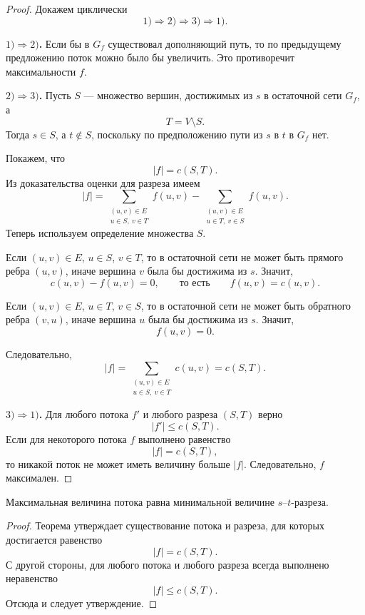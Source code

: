 \begin{proof}
	Докажем циклически
	\[
	1)\Rightarrow 2)\Rightarrow 3)\Rightarrow 1).
	\]
	
	\textbf{$1)\Rightarrow 2)$.}
	Если бы в $G_f$ существовал дополняющий путь, то по предыдущему предложению поток можно было бы увеличить. Это противоречит максимальности $f$.
	
	\textbf{$2)\Rightarrow 3)$.}
	Пусть $S$ --- множество вершин, достижимых из $s$ в остаточной сети $G_f$, а
	\[
	T=V\setminus S.
	\]
	Тогда $s\in S$, а $t\notin S$, поскольку по предположению пути из $s$ в $t$ в $G_f$ нет.
	
	Покажем, что
	\[
	|f|=c(S,T).
	\]
	Из доказательства оценки для разреза имеем
	\[
	|f|=
	\sum_{\substack{(u,v)\in E\\ u\in S,\ v\in T}} f(u,v)
	-
	\sum_{\substack{(u,v)\in E\\ u\in T,\ v\in S}} f(u,v).
	\]
	Теперь используем определение множества $S$.
	
	Если $(u,v)\in E$, $u\in S$, $v\in T$, то в остаточной сети не может быть прямого ребра $(u,v)$, иначе вершина $v$ была бы достижима из $s$. Значит,
	\[
	c(u,v)-f(u,v)=0,
	\qquad\text{то есть}\qquad
	f(u,v)=c(u,v).
	\]
	
	Если $(u,v)\in E$, $u\in T$, $v\in S$, то в остаточной сети не может быть обратного ребра $(v,u)$, иначе вершина $u$ была бы достижима из $s$. Значит,
	\[
	f(u,v)=0.
	\]
	
	Следовательно,
	\[
	|f|=
	\sum_{\substack{(u,v)\in E\\ u\in S,\ v\in T}} c(u,v)
	=
	c(S,T).
	\]
	
	\textbf{$3)\Rightarrow 1)$.}
	Для любого потока $f'$ и любого разреза $(S,T)$ верно
	\[
	|f'|\le c(S,T).
	\]
	Если для некоторого потока $f$ выполнено равенство
	\[
	|f|=c(S,T),
	\]
	то никакой поток не может иметь величину больше $|f|$. Следовательно, $f$ максимален.
\end{proof}

\begin{Proposition}{}{}
	Максимальная величина потока равна минимальной величине $s$--$t$-разреза.
\end{Proposition}

\begin{proof}
	Теорема утверждает существование потока и разреза, для которых достигается равенство
	\[
	|f|=c(S,T).
	\]
	С другой стороны, для любого потока и любого разреза всегда выполнено неравенство
	\[
	|f|\le c(S,T).
	\]
	Отсюда и следует утверждение.
\end{proof}

